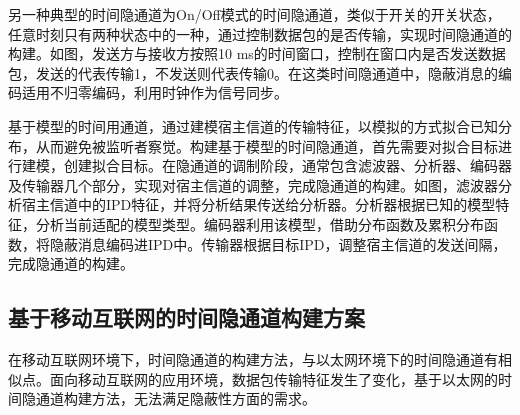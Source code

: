 另一种典型的时间隐通道为On/Off模式的时间隐通道，类似于开关的开关状态，任意时刻只有两种状态中的一种，通过控制数据包的是否传输，实现时间隐通道的构建。如图，发送方与接收方按照10 ms的时间窗口，控制在窗口内是否发送数据包，发送的代表传输1，不发送则代表传输0。在这类时间隐通道中，隐蔽消息的编码适用不归零编码，利用时钟作为信号同步。

基于模型的时间用通道，通过建模宿主信道的传输特征，以模拟的方式拟合已知分布，从而避免被监听者察觉。构建基于模型的时间隐通道，首先需要对拟合目标进行建模，创建拟合目标。在隐通道的调制阶段，通常包含滤波器、分析器、编码器及传输器几个部分，实现对宿主信道的调整，完成隐通道的构建。如图，滤波器分析宿主信道中的IPD特征，并将分析结果传送给分析器。分析器根据已知的模型特征，分析当前适配的模型类型。编码器利用该模型，借助分布函数及累积分布函数，将隐蔽消息编码进IPD中。传输器根据目标IPD，调整宿主信道的发送间隔，完成隐通道的构建。

\subsection{基于移动互联网的时间隐通道构建方案}
\label{chap:backinfo:ctc:mobile}
在移动互联网环境下，时间隐通道的构建方法，与以太网环境下的时间隐通道有相似点。面向移动互联网的应用环境，数据包传输特征发生了变化，基于以太网的时间隐通道构建方法，无法满足隐蔽性方面的需求。

